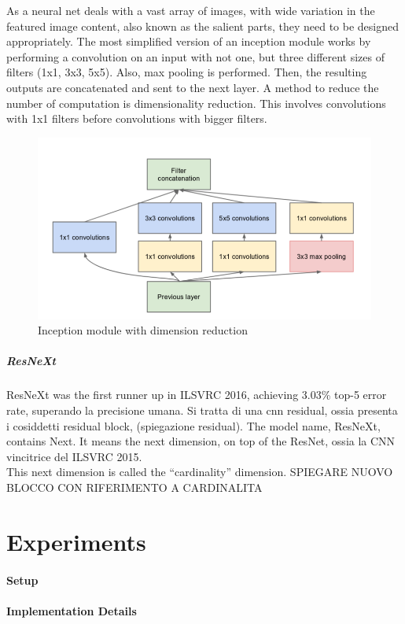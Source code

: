 \documentclass{article}
\begin{document}
As a neural net deals with a vast array of images, with wide variation in the featured image content, also known as the salient parts, they need to be designed appropriately. The most simplified version of an inception module works by performing a convolution on an input with not one, but three different sizes of filters (1x1, 3x3, 5x5). Also, max pooling is performed. Then, the resulting outputs are concatenated and sent to the next layer.
A method to reduce the number of computation is dimensionality reduction. This involves convolutions with 1x1 filters before convolutions with bigger filters.
\begin{figure}[h]
	\centering
	\includegraphics[width=0.7\linewidth]{image/inc_module}
	\caption{Inception module with dimension reduction}
	\label{fig:incmodule}
\end{figure}




\subparagraph{ResNeXt}
ResNeXt was the first runner up in ILSVRC 2016, achieving 3.03\% top-5 error rate, superando la precisione umana.
Si tratta di una cnn residual, ossia presenta i cosiddetti residual block, (spiegazione residual).
The model name, ResNeXt, contains Next. It means the next dimension, on top of the ResNet, ossia la CNN vincitrice del  ILSVRC 2015. \\
This next dimension is called the “cardinality” dimension.
SPIEGARE NUOVO BLOCCO CON RIFERIMENTO A CARDINALITA

\section{Experiments}

\paragraph{Setup}

\paragraph{Implementation Details}
\end{document}
